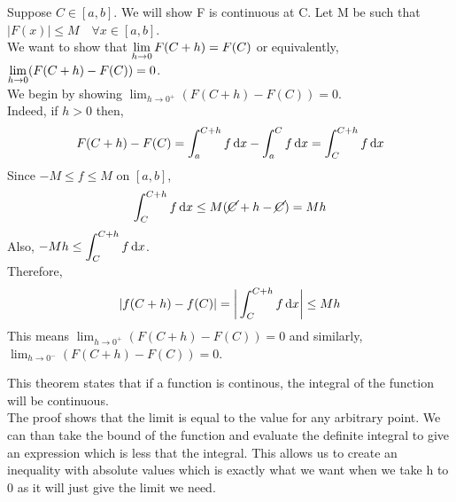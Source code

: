 \documentclass[12pt]{article}
\begin{document}
\begin{prf}{}
Suppose \(C \in [a, b]\). We will show F is continuous at C. Let M be such that \(|F(x)| \le M \quad \forall x \in [a, b]\).\\
We want to show that \(\displaystyle\lim_{h\to 0} F(C+h) = F(C)\) or equivalently, \(\displaystyle\lim_{h\to 0} (F(C+h) - F(C)) = 0\).\\
We begin by showing \(\lim_{h\to 0^+}(F(C+h) - F(C)) = 0\).\\
Indeed, if \(h > 0\) then, \[F(C+h) - F(C) = \displaystyle\int_a^{C+h} f\,\mathrm{d} x - \displaystyle\int_a^C f \,\mathrm{d} x = \displaystyle\int_C^{C+h} f \,\mathrm{d} x\]
Since \(-M \le f \le M\) on \([a, b]\),
\[\displaystyle\int_C^{C+h} f\,\mathrm{d} x \le M(\cancel{C}+ h - \cancel{C}) = Mh\]
Also, \(-Mh \le \displaystyle\int_C^{C+h}f\,\mathrm{d} x\).\\
Therefore, \[|f(C+h)-f(C)| = \bigg\vert\displaystyle\int_C^{C+h} f\,\mathrm{d} x\bigg\vert \le Mh\]
This means \(\lim_{h\to 0^+}(F(C+h) - F(C)) = 0\) and similarly, \(\lim_{h\to 0^-}(F(C+h) - F(C)) = 0\).\\
\end{prf}
\begin{explanation}{}
    This theorem states that if a function is continous, the integral of the function will be continuous.\\
The proof shows that the limit is equal to the value for any arbitrary point. We can than take the bound of the function and evaluate the definite integral to give an expression which is less that the integral. This allows us to create an inequality with absolute values which is exactly what we want when we take h to 0 as it will just give the limit we need.\\
\end{explanation}

\newpage
\end{document}
